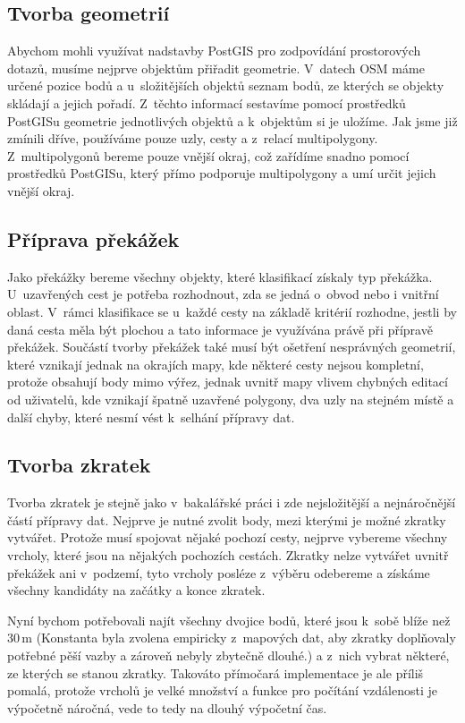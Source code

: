 \subsection{Tvorba geometrií}
Abychom mohli využívat nadstavby PostGIS pro zodpovídání prostorových dotazů,
musíme nejprve objektům přiřadit geometrie. V~datech OSM máme určené pozice bodů
a u~složitějších objektů seznam bodů, ze kterých se objekty skládají a jejich
pořadí. Z~těchto informací sestavíme pomocí prostředků PostGISu geometrie
jednotlivých objektů a k~objektům si je uložíme. Jak jsme již zmínili dříve,
používáme pouze uzly, cesty a z~relací multipolygony. Z~multipolygonů bereme
pouze vnější okraj, což zařídíme snadno pomocí prostředků PostGISu, který přímo
podporuje multipolygony a umí určit jejich vnější okraj.
 
\subsection{Příprava překážek}
Jako překážky bereme všechny objekty, které klasifikací získaly typ překážka.
U~uzavřených cest je potřeba rozhodnout, zda se jedná o~obvod nebo i vnitřní
oblast. V~rámci klasifikace se u~každé cesty na základě kritérií rozhodne,
jestli by daná cesta měla být plochou a tato informace je využívána právě při
přípravě překážek. Součástí tvorby překážek také musí být ošetření nesprávných
geometrií, které vznikají jednak na okrajích mapy, kde některé cesty nejsou
kompletní, protože obsahují body mimo výřez, jednak uvnitř mapy vlivem chybných
editací od uživatelů, kde vznikají špatně uzavřené polygony, dva uzly na stejném
místě a další chyby, které nesmí vést k~selhání přípravy dat.

\subsection{Tvorba zkratek}
Tvorba zkratek je stejně jako v~bakalářské práci i zde nejsložitější a
nejnáročnější částí přípravy dat. Nejprve je nutné zvolit body, mezi kterými je
možné zkratky vytvářet. Protože musí spojovat nějaké pochozí cesty, nejprve
vybereme všechny vrcholy, které jsou na nějakých pochozích cestách. Zkratky
nelze vytvářet uvnitř překážek ani v~podzemí, tyto vrcholy posléze z~výběru
odebereme a získáme všechny kandidáty na začátky a konce zkratek. 

Nyní bychom potřebovali najít všechny dvojice bodů, které jsou k~sobě blíže než
30\,m (Konstanta byla zvolena empiricky z~mapových dat, aby zkratky doplňovaly
potřebné pěší vazby a zároveň nebyly zbytečně dlouhé.) a z~nich vybrat některé,
ze kterých se stanou zkratky. Takováto přímočará implementace je ale příliš
pomalá, protože vrcholů je velké množství a funkce pro počítání vzdálenosti je
výpočetně náročná, vede to tedy na dlouhý výpočetní čas.

